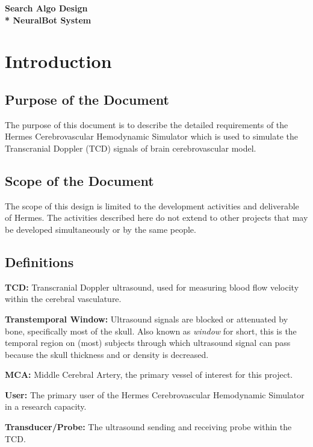 \documentclass[10pt]{article}
\begin{document}
{\huge \textbf{Search Algo Design \\* NeuralBot System}}
\vspace*{\fill}
\tableofcontents

\newpage

\setlength{\parskip}{1em}

\raggedright
\section{Introduction}
  \subsection{Purpose of the Document}
  The purpose of this document is to describe the detailed requirements
  of the Hermes Cerebrovascular Hemodynamic Simulator which is used to 
  simulate the Transcranial Doppler (TCD) signals of brain cerebrovascular model.

  \subsection{Scope of the Document}
  The scope of this design is limited to the development activities and
  deliverable of Hermes. The activities described here do not extend
  to other projects that may be developed simultaneously or by the
  same people.

\subsection{Definitions}

  \textbf{TCD:} Transcranial Doppler ultrasound, used for measuring
  blood flow velocity within the cerebral vasculature.

  \textbf{Transtemporal Window:} Ultrasound signals are blocked or
  attenuated by bone, specifically most of the skull.  Also known as
  \emph{window} for short, this is the temporal region on (most)
  subjects through which ultrasound signal can pass because the skull
  thickness and or density is decreased.

  \textbf{MCA:} Middle Cerebral Artery, the primary vessel of interest
  for this project.

  \textbf{User:} The primary user of the Hermes Cerebrovascular 
  Hemodynamic Simulator in a research capacity. 

  \textbf{Transducer/Probe:} The ultrasound sending and receiving
  probe within the TCD.
\end{document}
